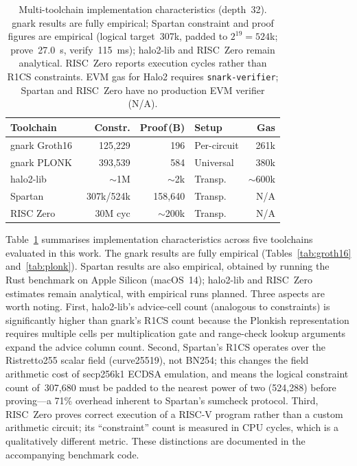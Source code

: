 \documentclass[conference]{IEEEtran}
\begin{document}
\begin{table}[t]
\caption{Multi-toolchain implementation characteristics (depth~32).
gnark results are fully empirical; Spartan constraint and proof figures
are empirical (logical target~307k, padded to $2^{19}=524$k;
prove~27.0~s, verify~115~ms); halo2-lib and RISC~Zero remain analytical.
RISC~Zero reports execution cycles rather than R1CS constraints.
EVM gas for Halo2 requires \texttt{snark-verifier}; Spartan and RISC~Zero
have no production EVM verifier (N/A).}
\label{tab:toolchains}
\centering\footnotesize
\begin{tabular}{lrrlr}
\toprule
\textbf{Toolchain} & \textbf{Constr.} & \textbf{Proof\,(B)} & \textbf{Setup} & \textbf{Gas} \\
\midrule
gnark Groth16~\cite{gnark} & 125,229   &     196 & Per-circuit & 261k \\
gnark PLONK~\cite{gnark}   & 393,539   &     584 & Universal   & 380k \\
halo2-lib~\cite{halo2lib}  & $\sim$1M  & $\sim$2k & Transp.   & $\sim$600k \\
Spartan~\cite{Spartan}     & 307k/524k & 158,640 & Transp.     & N/A \\
RISC Zero~\cite{RISCZero}  & 30M cyc   & $\sim$200k & Transp. & N/A \\
\bottomrule
\end{tabular}
\end{table}

Table~\ref{tab:toolchains} summarises implementation characteristics
across five toolchains evaluated in this work.
The gnark results are fully empirical (Tables~\ref{tab:groth16}
and~\ref{tab:plonk}).
Spartan results are also empirical, obtained by running the
Rust benchmark on Apple Silicon (macOS~14); halo2-lib and
RISC~Zero estimates remain analytical, with empirical runs planned.
Three aspects are worth noting.
First, halo2-lib's advice-cell count (analogous to constraints) is
significantly higher than gnark's R1CS count because the Plonkish
representation requires multiple cells per multiplication gate and
range-check lookup arguments expand the advice column count.
Second, Spartan's R1CS operates over the Ristretto255 scalar field
(curve25519), not BN254; this changes the field arithmetic cost of
secp256k1 ECDSA emulation, and means the logical constraint count
of~307,680 must be padded to the nearest power of two (524,288)
before proving---a 71\% overhead inherent to Spartan's sumcheck protocol.
Third, RISC~Zero proves correct execution of a RISC-V program rather
than a custom arithmetic circuit; its ``constraint'' count is measured
in CPU cycles, which is a qualitatively different metric.
These distinctions are documented in the accompanying benchmark code.
\end{document}
